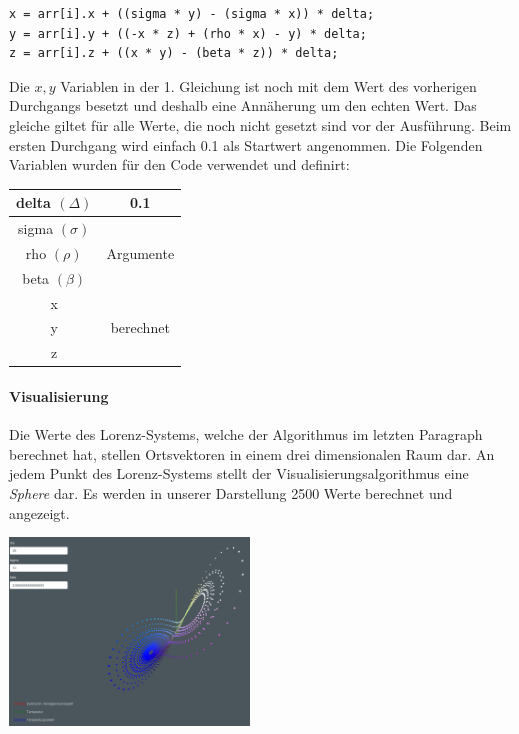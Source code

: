 \documentclass[implementation]{subfiles}
\begin{document}
	\begin{centerFigure}
		\begin{lstlisting}
x = arr[i].x + ((sigma * y) - (sigma * x)) * delta;
y = arr[i].y + ((-x * z) + (rho * x) - y) * delta;
z = arr[i].z + ((x * y) - (beta * z)) * delta;
		\end{lstlisting}
	\end{centerFigure}
	
	Die $ x, y $ Variablen in der 1. Gleichung ist noch mit dem Wert des vorherigen Durchgangs besetzt und deshalb eine Annäherung um den echten Wert. Das gleiche giltet für alle Werte, die noch nicht gesetzt sind vor der Ausführung. Beim ersten Durchgang wird einfach 0.1 als Startwert angenommen. Die Folgenden Variablen wurden für den Code verwendet und definirt:
	
	\begin{centerFigure}
		\begin{tabular}{| c | c |}
			\hline
			delta $ (\Delta) $ & 0.1 \\\hline
			sigma $ (\sigma) $ & \multirow{3}{*}{Argumente}\\
			rho $(\rho) $ & \\
			beta $ (\beta) $ & \\\hline
			x & \multirow{3}{*}{berechnet}\\
			y & \\
			z & \\\hline
		\end{tabular}
	\end{centerFigure}

	\paragraph{Visualisierung}
	Die Werte des Lorenz-Systems, welche der Algorithmus im letzten Paragraph berechnet hat, stellen Ortsvektoren in einem drei dimensionalen Raum dar. An jedem Punkt des Lorenz-Systems stellt der Visualisierungsalgorithmus eine \textit{Sphere} dar. Es werden in unserer Darstellung 2500 Werte berechnet und angezeigt.
	
	\begin{centerFigure}
		\includegraphics[height=5cm]{assets/implementation/Visualisierung}
	\end{centerFigure}
\end{document}
